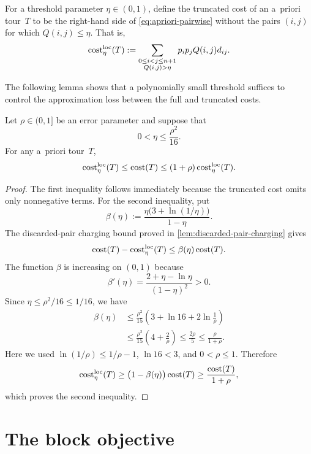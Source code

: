 \documentclass[12pt,a4paper,oneside]{report}
\begin{document}
For a threshold parameter $\eta\in(0,1)$, define the truncated cost of an
a~priori tour~$T$ to be the right-hand side of
\cref{eq:apriori-pairwise} without the pairs $(i,j)$ for which
$Q(i,j)\le\eta$.  That is,
\begin{equation}\label{eq:local-pair-cost}
    \operatorname{cost}^{\operatorname{loc}}_{\eta}(T)
    :=
    \sum_{\substack{0\le i<j\le n+1\\Q(i,j)>\eta}}
    p_i p_j Q(i,j)d_{ij}.
\end{equation}

The following lemma shows that a polynomially small threshold suffices to
control the approximation loss between the full and truncated costs.

\begin{lemma}
\label{lem:long-gap-truncation}
Let $\rho\in(0,1]$ be an error parameter and suppose that
\begin{equation}\label{eq:long-gap-truncation}
    0<\eta\le\frac{\rho^2}{16}.
\end{equation}
For any a~priori tour~$T$,
\[
    \operatorname{cost}^{\operatorname{loc}}_{\eta}(T)
    \le \operatorname{cost}(T)
    \le(1+\rho)\operatorname{cost}^{\operatorname{loc}}_{\eta}(T).
\]
\end{lemma}

\begin{proof}
The first inequality follows immediately because the truncated cost omits
only nonnegative terms.  For the second inequality, put
\[
    \beta(\eta):=
    \frac{\eta\bigl(3+\ln(1/\eta)\bigr)}{1-\eta}.
\]
The discarded-pair charging bound proved in
\cref{lem:discarded-pair-charging} gives
\[
    \operatorname{cost}(T)-\operatorname{cost}^{\operatorname{loc}}_{\eta}(T)
    \le\beta(\eta)\operatorname{cost}(T).
\]
The function $\beta$ is increasing on $(0,1)$ because
\[
    \beta'(\eta)
    =\frac{2+\eta-\ln\eta}{(1-\eta)^2}>0.
\]
Since
$\eta\le\rho^2/16\le1/16$, we have
\begin{align*}
    \beta(\eta)
    &\le\frac{\rho^2}{15}
        \left(3+\ln16+2\ln\frac1\rho\right)\\
    &\le\frac{\rho^2}{15}\left(4+\frac2\rho\right)
    \le\frac{2\rho}{5}
    \le\frac{\rho}{1+\rho}.
\end{align*}
Here we used $\ln(1/\rho)\le1/\rho-1$, $\ln16<3$, and
$0<\rho\le1$.  Therefore
\[
    \operatorname{cost}^{\operatorname{loc}}_{\eta}(T)
    \ge\bigl(1-\beta(\eta)\bigr)\operatorname{cost}(T)
    \ge\frac{\operatorname{cost}(T)}{1+\rho},
\]
which proves the second inequality.
\end{proof}

\section{The block objective}\label{sec:dp-block-objective}
\end{document}
